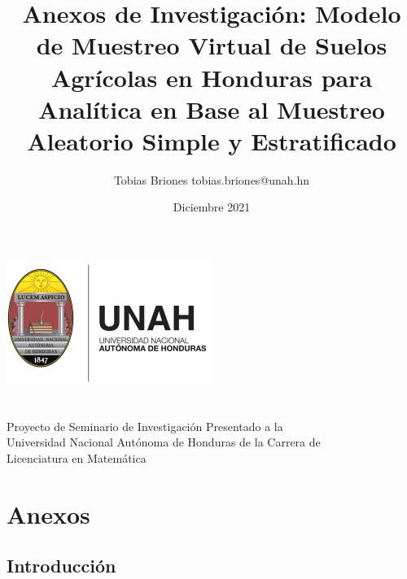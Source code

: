 \documentclass{article}
\title{Anexos de Investigación: Modelo de Muestreo Virtual de Suelos Agrícolas en Honduras para Analítica en Base al Muestreo Aleatorio Simple y Estratificado}
\author{Tobias Briones \bigbreak tobias.briones@unah.hn}
\date{Diciembre 2021}
\begin{document}
\makeatletter
    \begin{titlepage}
        \begin{center}
            \includegraphics[width=0.3\linewidth]{ref/logo-unah.png}\\[4ex]
            {\huge \bfseries \@title 
            \vspace{1cm}}\\[2ex]
            {\LARGE \@author}\\[50ex] 
            
            {\large
            Proyecto de Seminario de Investigación Presentado a la\\
            Universidad Nacional Autónoma de Honduras de la Carrera de\\
            Licenciatura en Matemática
            }\\[2ex]
            
            {\large \@date}
        \end{center}
    \end{titlepage}
\makeatother
\thispagestyle{empty}
\newpage

\section{Anexos}

\subsection{Introducción}
\end{document}
